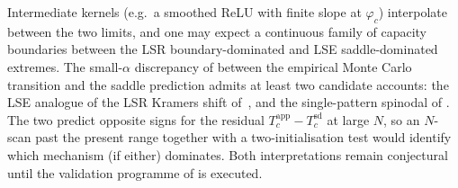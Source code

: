 \documentclass[11pt]{article}
\begin{document}
Intermediate kernels (e.g.\ a smoothed ReLU with finite slope at
$\varphi_c$) interpolate between the two limits, and one may expect a
continuous family of capacity boundaries between the LSR
boundary-dominated and LSE saddle-dominated extremes. The
small-$\alpha$ discrepancy of  between the
empirical Monte Carlo transition and the saddle prediction admits at
least two candidate accounts: the LSE analogue of the LSR Kramers
shift of~\citep{petrova2026metastable}, and the single-pattern
spinodal of . The two predict opposite signs
for the residual $T_c^{\mathrm{app}} - T_c^{\mathrm{sd}}$ at large
$N$, so an $N$-scan past the present range together with a
two-initialisation test would identify which mechanism (if either)
dominates. Both interpretations remain conjectural until the
validation programme of  is executed.



\end{document}
